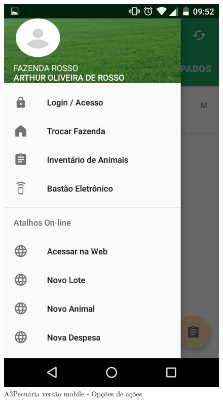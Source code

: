 \documentclass[12pt]{article}
\begin{document}
\begin{titlepage}
\begin{figure}[!h]
\begin{center}
\caption{A3Pecuária versão mobile - Opções de ações}
\includegraphics[width=6in]{img/a3pecuariaapp2.jpeg}

\end{center}
\end{figure}




\newpage


\end{titlepage}
\end{document}
